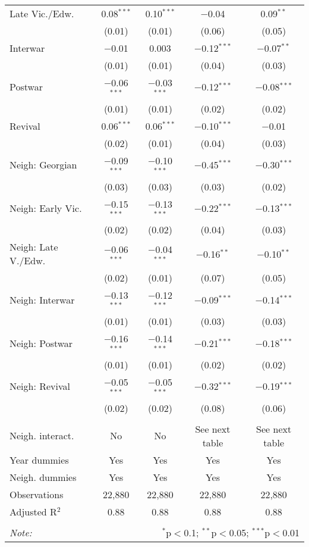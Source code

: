 \begin{table}[!htbp]
\begin{tabular}{@{\extracolsep{5pt}}lcccc}
  Late Vic./Edw. & 0.08$^{***}$ & 0.10$^{***}$ & $-$0.04 & 0.09$^{**}$ \\ 
  & (0.01) & (0.01) & (0.06) & (0.05) \\ 
  Interwar & $-$0.01 & 0.003 & $-$0.12$^{***}$ & $-$0.07$^{**}$ \\ 
  & (0.01) & (0.01) & (0.04) & (0.03) \\ 
  Postwar & $-$0.06$^{***}$ & $-$0.03$^{***}$ & $-$0.12$^{***}$ & $-$0.08$^{***}$ \\ 
  & (0.01) & (0.01) & (0.02) & (0.02) \\ 
  Revival & 0.06$^{***}$ & 0.06$^{***}$ & $-$0.10$^{***}$ & $-$0.01 \\ 
  & (0.02) & (0.01) & (0.04) & (0.03) \\ 
  Neigh: Georgian & $-$0.09$^{***}$ & $-$0.10$^{***}$ & $-$0.45$^{***}$ & $-$0.30$^{***}$ \\ 
  & (0.03) & (0.03) & (0.03) & (0.02) \\ 
  Neigh: Early Vic. & $-$0.15$^{***}$ & $-$0.13$^{***}$ & $-$0.22$^{***}$ & $-$0.13$^{***}$ \\ 
  & (0.02) & (0.02) & (0.04) & (0.03) \\ 
  Neigh: Late V./Edw. & $-$0.06$^{***}$ & $-$0.04$^{***}$ & $-$0.16$^{**}$ & $-$0.10$^{**}$ \\ 
  & (0.02) & (0.01) & (0.07) & (0.05) \\ 
  Neigh: Interwar & $-$0.13$^{***}$ & $-$0.12$^{***}$ & $-$0.09$^{***}$ & $-$0.14$^{***}$ \\ 
  & (0.01) & (0.01) & (0.03) & (0.03) \\ 
  Neigh: Postwar & $-$0.16$^{***}$ & $-$0.14$^{***}$ & $-$0.21$^{***}$ & $-$0.18$^{***}$ \\ 
  & (0.01) & (0.01) & (0.02) & (0.02) \\ 
  Neigh: Revival & $-$0.05$^{***}$ & $-$0.05$^{***}$ & $-$0.32$^{***}$ & $-$0.19$^{***}$ \\ 
  & (0.02) & (0.02) & (0.08) & (0.06) \\ 
 \hline \\[-1.8ex] 
Neigh. interact. & No & No & See next table & See next table \\ 
Year dummies & Yes & Yes & Yes & Yes \\ 
Neigh. dummies & Yes & Yes & Yes & Yes \\ 
Observations & 22,880 & 22,880 & 22,880 & 22,880 \\ 
Adjusted R$^{2}$ & 0.88 & 0.88 & 0.88 & 0.88 \\ 
\hline 
\hline \\[-1.8ex] 
\textit{Note:}  & \multicolumn{4}{r}{$^{*}$p$<$0.1; $^{**}$p$<$0.05; $^{***}$p$<$0.01} \\ 
\end{tabular} 
\end{table} 

